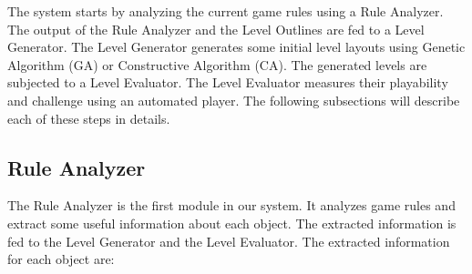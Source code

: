 \documentclass[letterpaper]{article}
\begin{document}
The system starts by analyzing the current game rules using a Rule Analyzer. The output of the Rule Analyzer and the Level Outlines are fed to a Level Generator. The Level Generator generates some initial level layouts using Genetic Algorithm (GA) or Constructive Algorithm (CA). The generated levels are subjected to a Level Evaluator. The Level Evaluator measures their playability and challenge using an automated player. The following subsections will describe each of these steps in details.

\subsection{Rule Analyzer}
The Rule Analyzer is the first module in our system. It analyzes game rules and extract some useful information about each object. The extracted information is fed to the Level Generator and the Level Evaluator. The extracted information for each object are:
\end{document}
